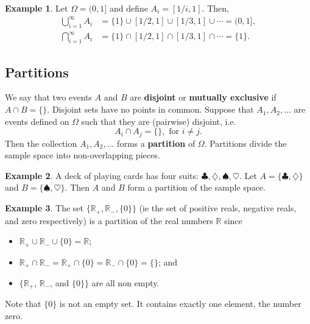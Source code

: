 \documentclass[
]{book}
\providecommand{\tightlist}{%
  \setlength{\itemsep}{0pt}\setlength{\parskip}{0pt}}
\newcommand{\bbR}{\mathbb{R}}
\theoremstyle{definition}
\theoremstyle{definition}
\newtheorem{example}{Example}[chapter]
\theoremstyle{definition}
\theoremstyle{definition}
\theoremstyle{remark}
\begin{document}
\begin{example}
Let \(\Omega=(0,1]\) and define \(A_i=[1/i, 1]\). Then,
\begin{align*}
\bigcup_{i=1}^\infty A_i
&= \{1\} \cup [1/2, 1] \cup [1/3, 1] \cup \cdots = (0,1], \\
\bigcap_{i=1}^\infty A_i
&= \{1\} \cap [1/2, 1] \cap [1/3, 1] \cap \cdots = \{1\}.
\end{align*}
\end{example}

\hypertarget{partitions}{%
\subsection{Partitions}\label{partitions}}

We say that two events \(A\) and \(B\) are \textbf{disjoint} or \textbf{mutually exclusive} if \(A \cap B = \{ \}\). Disjoint sets have no points in common.
Suppose that \(A_1,A_2,\dots\) are events defined on \(\Omega\) such that they are (pairwise) disjoint, i.e.~
\[
A_i \cap A_j = \{ \}, \text{ for } i \neq j.
\]
Then the collection \(A_1,A_2,\dots\) forms a \textbf{partition} of \(\Omega\).
Partitions divide the sample space into non-overlapping pieces.

\begin{example}
A deck of playing cards has four suits: \(\clubsuit, \diamondsuit, \spadesuit, \heartsuit\). Let \(A=\{\clubsuit,\diamondsuit\}\) and \(B=\{\spadesuit, \heartsuit\}\). Then \(A\) and \(B\) form a partition of the sample space.
\end{example}

\begin{example}
The set \(\{\bbR_+, \bbR_{-}, \{0\}\}\) (ie the set of positive reals, negative reals, and zero respectively) is a partition of the real numbers \(\bbR\) since

\begin{itemize}
\tightlist
\item
  \(\bbR_{+} \cup \bbR_{-} \cup \{0\}=\bbR\);
\item
  \(\bbR_{+} \cap \bbR_{-} = \bbR_{+} \cap \{0\} = \bbR_{-} \cap \{0\} = \{ \}\); and
\item
  \(\{\bbR_{+}\), \(\bbR_{-}\), and \(\{0\}\}\) are all non empty.
\end{itemize}

Note that \(\{0\}\) is not an empty set. It contains exactly one element, the number zero.
\end{example}
\end{document}
